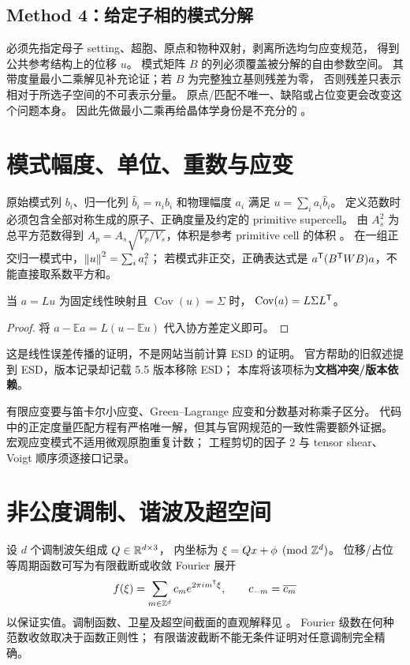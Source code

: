 \subsection{Method 4：给定子相的模式分解}
必须先指定母子 setting、超胞、原点和物种双射，剥离所选均匀应变规范，
得到公共参考结构上的位移 $u$。
模式矩阵 $B$ 的列必须覆盖被分解的自由参数空间。
其带度量最小二乘解见补充论证；若 $B$ 为完整独立基则残差为零，
否则残差只表示相对于所选子空间的不可表示分量。
原点/匹配不唯一、缺陷或占位变更会改变这个问题本身。
因此先做最小二乘再给晶体学身份是不充分的
\citep{Campbell2006,PerezMato2010,Amplimodes2009}。

\section{模式幅度、单位、重数与应变}\label{sec:amplitudes}
原始模式列 $b_i$、归一化列 $\hat b_i=n_i b_i$ 和物理幅度 $a_i$ 满足
$u=\sum_i a_i\hat b_i$。
定义范数时必须包含全部对称生成的原子、正确度量及约定的 primitive supercell。
由 $A_s^2$ 为总平方范数得到
$A_p=A_s\sqrt{V_p/V_s}$，体积是参考 primitive cell 的体积
\citep{OfficialHelp}。
在一组正交归一模式中，$\left\lVert u\right\rVert^2=\sum_i a_i^2$；
若模式非正交，正确表达式是 $a^\mathsf T(B^\mathsf T WB)a$，不能直接取系数平方和。

\begin{proposition}[协方差传播的条件]
当 $a=Lu$ 为固定线性映射且 $\operatorname{Cov}(u)=\Sigma$ 时，
$\operatorname{Cov}(a)=L\Sigma L^\mathsf T$。
\end{proposition}
\begin{proof}
将 $a-\mathbb Ea=L(u-\mathbb Eu)$ 代入协方差定义即可。
\end{proof}
这是线性误差传播的证明，不是网站当前计算 ESD 的证明。
官方帮助的旧叙述提到 ESD，版本记录却记载 5.5 版本移除 ESD；
本库将该项标为\textbf{文档冲突/版本依赖}\citep{OfficialHelp,OfficialVersions}。

有限应变要与笛卡尔小应变、Green--Lagrange 应变和分数基对称乘子区分。
代码中的正定度量匹配方程有严格唯一解，但其与官网规范的一致性需要额外证据。
宏观应变模式不适用微观原胞重复计数；
工程剪切的因子 $2$ 与 tensor shear、Voigt 顺序须逐接口记录。

\section{非公度调制、谐波及超空间}\label{sec:ssg}
设 $d$ 个调制波矢组成 $Q\in\mathbb R^{d\times3}$，
内坐标为 $\xi=Qx+\phi\pmod{\mathbb Z^d}$。
位移/占位等周期函数可写为有限截断或收敛 Fourier 展开
\[
 f(\xi)=\sum_{m\in\mathbb Z^d}c_m e^{2\pi i m^\mathsf T\xi},
 \qquad c_{-m}=\overline{c_m}
\]
以保证实值。调制函数、卫星及超空间截面的直观解释见 \citet{Wagner2009}。
Fourier 级数在何种范数收敛取决于函数正则性；
有限谐波截断不能无条件证明对任意调制完全精确。

